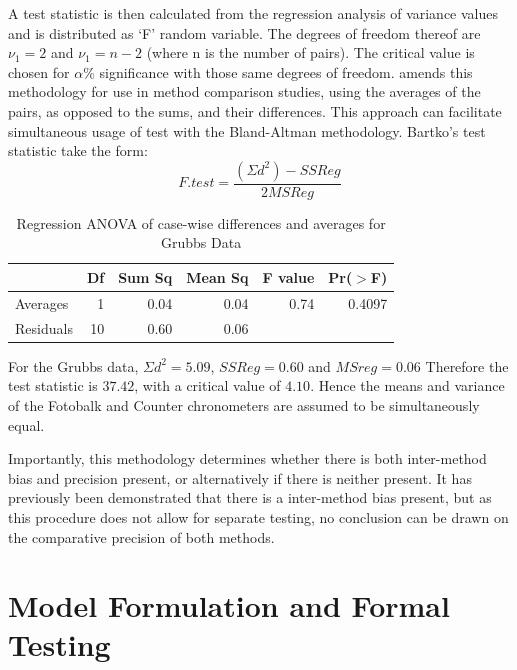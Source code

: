 \documentclass[12pt, a4paper]{report}
\theoremstyle{plain}
\theoremstyle{definition}
\theoremstyle{remark}
\begin{document}
		A test statistic is then calculated from the regression analysis
		of variance values \citep{BB89} and is distributed as `F' random
		variable. The degrees of freedom thereof are $\nu_{1}=2$ and
		$\nu_{1}=n-2$ (where n is the number of pairs). The critical value
		is chosen for $\alpha\%$ significance with those same degrees of
		freedom. \citet{Bartko} amends this methodology for use in method
		comparison studies, using the averages of the pairs, as opposed to
		the sums, and their differences. This approach can facilitate
		simultaneous usage of test with the Bland-Altman methodology.
		Bartko's test statistic take the form:
		\begin{equation} F.test = \frac{(\Sigma d^{2})-SSReg}{2MSReg}
		\end{equation}
		\begin{table}[ht]
			\begin{center}
				\begin{tabular}{lrrrrr}
					\hline
					& Df & Sum Sq & Mean Sq & F value & Pr($>$F) \\
					\hline
					Averages & 1 & 0.04 & 0.04 & 0.74 & 0.4097 \\
					Residuals & 10 & 0.60 & 0.06 &  &  \\
					\hline
				\end{tabular}
				\caption{Regression ANOVA of case-wise differences and averages
					for Grubbs Data}
			\end{center}
		\end{table}
		
		For the Grubbs data, $\Sigma d^{2}=5.09 $, $SSReg = 0.60$ and
		$MSreg=0.06$ Therefore the test statistic is $37.42$, with a
		critical value of $4.10$. Hence the means and variance of the
		Fotobalk and Counter chronometers are assumed to be simultaneously
		equal.
		
		Importantly, this methodology determines whether there is both
		inter-method bias and precision present, or alternatively if there
		is neither present. It has previously been demonstrated that there
		is a inter-method bias present, but as this procedure does not
		allow for separate testing, no conclusion can be drawn on the
		comparative precision of both methods.
		
		
		


	\section{Model Formulation and Formal Testing}
	
\end{document}
